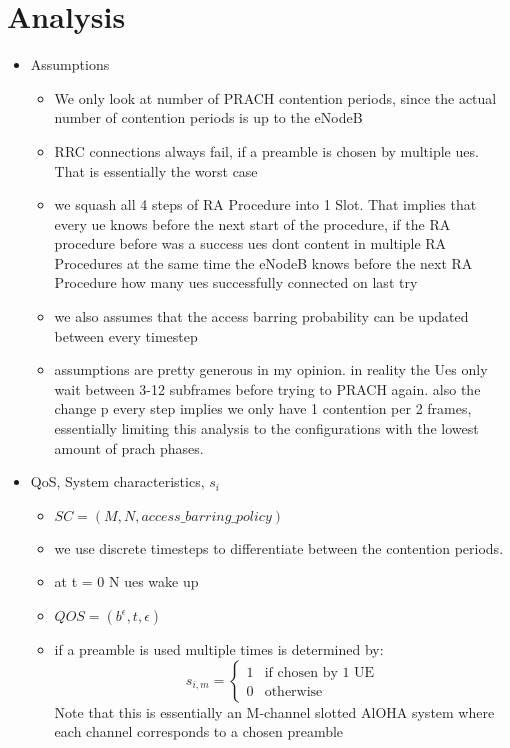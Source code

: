 \documentclass[conference]{IEEEtran}
\begin{document}
\section{Analysis}
\begin{itemize}
    \item Assumptions
    \begin{itemize}
        \item We only look at number of PRACH contention periods, since the actual number of contention periods is up to the eNodeB
        \item RRC connections always fail, if a preamble is chosen by multiple ues.
        That is essentially the worst case
        \item we squash all 4 steps of RA Procedure into 1 Slot.
        That implies that every ue knows before the next start of the procedure, if the RA procedure before was a success
        ues dont content in multiple RA Procedures at the same time
        the eNodeB knows before the next RA Procedure how many ues successfully connected on last try
        \item we also assumes that the access barring probability can be updated between every timestep
        \item assumptions are pretty generous in my opinion.
        in reality the Ues only wait between 3-12 subframes before trying to PRACH again.
        also the change p every step implies we only have 1 contention per 2 frames, essentially limiting this analysis
        to the configurations with the lowest amount of prach phases.
    \end{itemize}
    \item QoS, System characteristics, $s_i$
    \begin{itemize}
        \item $SC = (M, N, access\_barring\_policy)$
        \item we use discrete timesteps to differentiate between the contention periods.
        \item at t = 0 N ues wake up
        \item $QOS = (b^\epsilon, t, \epsilon)$
        \item if a preamble is used multiple times is determined by:
        \[s_{i,m}= \begin{cases}
                       1& \text{if chosen by 1 UE}\\
                       0 &\text{otherwise}
        \end{cases}\]
        Note that this is essentially an M-channel slotted AlOHA system where each channel corresponds to a chosen preamble

\end{itemize}
\end{itemize}
\end{document}
